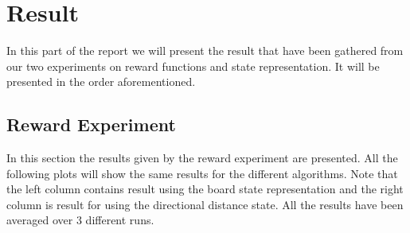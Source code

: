 \documentclass[result.tex]{subfiles}
\begin{document}
    \section*{\centering Result}

    In this part of the report we will present the result that have been gathered from our two experiments on reward functions and state representation. It will be presented in the order aforementioned.

    \subsection*{Reward Experiment}

    In this section the results given by the reward experiment are presented. All the following plots will show the same results for the different algorithms. Note that the left column contains result using the board state representation and the right column is result for using the directional distance state. All the results have been averaged over 3 different runs.
\end{document}
